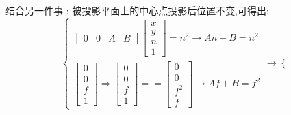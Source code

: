 \documentclass[UTF8,12pt]{ctexbook}
\begin{document}
{{{{{\begin{itemize}
{\begin{itemize}
{                        结合另一件事 : 被投影平面上的中心点投影后位置不变,可得出:$$
                          \begin{cases}
                            \begin{bmatrix}
                              0 & 0 & A & B
                            \end{bmatrix}
                            \begin{bmatrix}
                              x \\
                              y \\
                              n \\
                              1
                            \end{bmatrix}
                            =
                            n^2
                            \rightarrow
                            An + B = n^2 \\
                            \begin{bmatrix}
                              0 \\
                              0 \\
                              f \\
                              1
                            \end{bmatrix}
                            \Rightarrow
                            \begin{bmatrix}
                              0 \\
                              0 \\
                              f \\
                              1
                            \end{bmatrix}
                            ==
                            \begin{bmatrix}
                              0   \\
                              0   \\
                              f^2 \\
                              f
                            \end{bmatrix}
                            \rightarrow
                            Af + B = f^2
                          \end{cases}
                          \rightarrow
                          \begin{cases}

\end{cases}$$}
\end{itemize}}
\end{itemize}}}}}}
\end{document}
